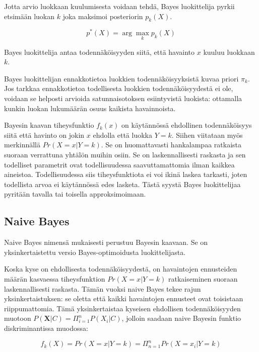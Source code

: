 \documentclass[finnish,twoside,openright]{HYgraduMLDS}
\begin{document}
Jotta arvio luokkaan kuulumisesta voidaan tehdä, Bayes luokittelija pyrkii etsimään luokan $k$ joka maksimoi posteriorin $p_k(X)$. 

\begin{equation}
    p^*(X) = \arg \max_k p_k(X)
\end{equation}

Bayes luokittelija antaa todennäköisyyden siitä, että havainto $x$ kuuluu luokkaan $k$.

Bayes luokittelijan ennakkotietoa luokkien todennäköisyyksistä kuvaa priori $\pi_k$. Jos tarkkaa ennakkotietoa todellisesta luokkien todennäköisyydestä ei ole, voidaan se helposti arvioida satunnaisotoksen esiintyvistä luokista: ottamalla kunkin luokan lukumäärän osuus kaikista havainnoista. 

Bayesin kaavan tiheysfunktio $f_k(x)$ on käytännössä ehdollinen todennäköisyys siitä että havinto on jokin $x$ ehdolla että luokka $Y = k$. Siihen viitataan myös merkinnällä $Pr(X = x | Y = k)$. Se on huomattavasti hankalampaa ratkaista suoraan verrattuna yhtälön muihin osiin. Se on laskennallisesti raskasta ja sen todelliset parametrit ovat todellisuudessa saavuttamattomia ilman kaikkea aineistoa. Todellisuudessa siis tiheysfunktiota ei voi ikinä laskea tarkasti, joten todellista arvoa ei käytännössä edes lasketa. Tästä syystä Bayes luokittelijaa pyritään tavalla tai toisella approksimoimaan\cite{james2013ISLR}.


\subsection{Naive Bayes}

Naive Bayes nimensä mukaisesti perustuu Bayesin kaavaan. Se on yksinkertaistettu versio Bayes-optimoidusta luokittelijasta\cite{rish2001empirical}.

Koska kyse on ehdollisesta todennäköisyydestä, on havaintojen ennusteiden määrän kasvaessa tiheysfunktion $Pr(X = x | Y = k)$ ratkaiseminen suoraan laskennallisesti raskasta. Tämän vuoksi naive Bayes tekee rajun yksinkertaistuksen: se oletta että kaikki havaintojen ennusteet ovat toisistaan riippumattomia. Tämä yksinkertaistaa kyseisen ehdollisen todennäköisyyden muotoon $P(\textbf{X}|C) = \Pi^n_{i=1} P(X_i | C)$, jolloin saadaan naive Bayesin funktio diskriminantissa muodossa:

\begin{equation}
    f_k(X) = Pr(X = x | Y = k) = \Pi^n_{n=1} Pr(X = x_i | Y = k)
\end{equation}
\end{document}
